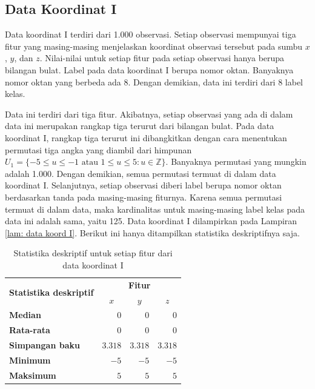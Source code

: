 \subsection{Data Koordinat I} \label{tentang dk1}
\noindent Data koordinat I terdiri dari 1.000 observasi. Setiap observasi mempunyai tiga fitur yang masing-masing menjelaskan koordinat observasi tersebut pada sumbu $x$, $y$, dan $z$. Nilai-nilai untuk setiap fitur pada setiap observasi hanya berupa bilangan bulat. Label pada data koordinat I berupa nomor oktan. Banyaknya nomor oktan yang berbeda ada 8. Dengan demikian, data ini terdiri dari 8 label kelas.

\noindent Data ini terdiri dari tiga fitur. Akibatnya, setiap observasi yang ada di dalam data ini merupakan rangkap tiga terurut dari bilangan bulat. Pada data koordinat I, rangkap tiga terurut ini dibangkitkan dengan cara menentukan permutasi tiga angka yang diambil dari himpunan $U_1 = \{-5\leq u \leq -1 \text{ atau } 1 \leq u \leq 5 : u \in \mathbb{Z} \}$. Banyaknya permutasi yang mungkin adalah 1.000. Dengan demikian, semua permutasi termuat di dalam data koordinat I. Selanjutnya, setiap observasi diberi label berupa nomor oktan berdasarkan tanda pada masing-masing fiturnya. Karena semua permutasi termuat di dalam data, maka kardinalitas untuk masing-masing label kelas pada data ini adalah sama, yaitu 125. Data koordinat I dilampirkan pada Lampiran \ref{lam: data koord I}. Berikut ini hanya ditampilkan statistika deskriptifnya saja.

\begin{table}[htbp!]
  \centering
  \caption{Statistika deskriptif untuk setiap fitur dari data koordinat I}
    \begin{tabular}{lrrr}
    \toprule
    \multicolumn{1}{c}{\multirow{2}[4]{*}{\textbf{Statistika deskriptif}}} & \multicolumn{3}{c}{\textbf{Fitur}} \\
\cmidrule{2-4}          & \multicolumn{1}{c}{\boldmath{}$x$\unboldmath{}} & \multicolumn{1}{c}{\boldmath{}$y$\unboldmath{}} & \multicolumn{1}{c}{\boldmath{}$z$\unboldmath{}} \\
\cmidrule{2-4}    \textbf{Median} & $\num{0}$ & $\num{0}$ & $\num{0}$ \\
    \textbf{Rata-rata} & $\num{0}$ & $\num{0}$ & $\num{0}$ \\
    \textbf{Simpangan baku} & $\num{3,318}$ & $\num{3,318}$ & $\num{3,318}$ \\
    \textbf{Minimum} & $\num{-5}$ & $\num{-5}$ & $\num{-5}$ \\
    \textbf{Maksimum} & $\num{5}$ & $\num{5}$ & $\num{5}$ \\
    \bottomrule
    \end{tabular}%
  \label{tab: stat desc dk1}%
\end{table}%

